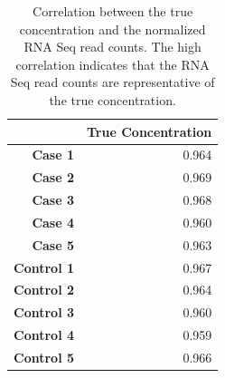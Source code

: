 \begin{table}[h]
	\centering
	\caption[Correlation between concentration and counts]{Correlation between the true concentration and the normalized RNA Seq read counts.
		The high correlation indicates that the RNA Seq read counts are representative of the true concentration.}
	\label{tab:ercc_correlation}
	\begin{tabular}{rr}
		\toprule
		& \textbf{True Concentration} \\
		\midrule
		\textbf{Case 1} & 0.964 \\
		\textbf{Case 2} & 0.969 \\
		\textbf{Case 3} & 0.968 \\
		\textbf{Case 4} & 0.960 \\
		\textbf{Case 5} & 0.963 \\
		\textbf{Control 1} & 0.967 \\
		\textbf{Control 2} & 0.964 \\
		\textbf{Control 3} & 0.960 \\
		\textbf{Control 4} & 0.959 \\
		\textbf{Control 5} & 0.966 \\
		\bottomrule
	\end{tabular}%
\end{table}
\\
\\



